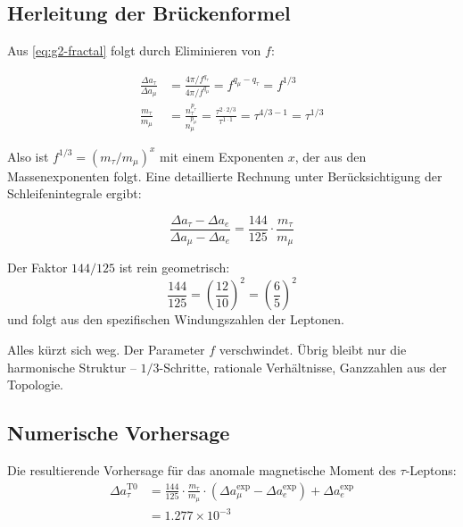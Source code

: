 	\subsection{Herleitung der Brückenformel}
	
	Aus \eqref{eq:g2-fractal} folgt durch Eliminieren von $f$:
	
	\begin{align}
		\frac{\Delta a_\tau}{\Delta a_\mu} &= \frac{4\pi/f^{q_\tau}}{4\pi/f^{q_\mu}} = f^{q_\mu - q_\tau} = f^{1/3} \\
		\frac{m_\tau}{m_\mu} &= \frac{n_\tau^{p_\tau}}{n_\mu^{p_\mu}} = \frac{\tau^{2 \cdot 2/3}}{\tau^{1 \cdot 1}} = \tau^{4/3 - 1} = \tau^{1/3}
	\end{align}
	
	Also ist $f^{1/3} = (m_\tau/m_\mu)^x$ mit einem Exponenten $x$, der aus den Massenexponenten folgt. Eine detaillierte Rechnung unter Berücksichtigung der Schleifenintegrale ergibt:
	
	\begin{keypoint}[g-2-Brückenformel]
		\begin{equation}
			\frac{\Delta a_\tau - \Delta a_e}{\Delta a_\mu - \Delta a_e} = \frac{144}{125} \cdot \frac{m_\tau}{m_\mu}
			\label{eq:brueckenformel}
		\end{equation}
	\end{keypoint}
	
	Der Faktor $144/125$ ist rein geometrisch:
	\begin{equation}
		\frac{144}{125} = \left( \frac{12}{10} \right)^2 = \left( \frac{6}{5} \right)^2
	\end{equation}
	und folgt aus den spezifischen Windungszahlen der Leptonen.
	
	Alles kürzt sich weg. Der Parameter $f$ verschwindet. Übrig bleibt nur die harmonische Struktur -- $1/3$-Schritte, rationale Verhältnisse, Ganzzahlen aus der Topologie.
	
	\subsection{Numerische Vorhersage}
	
	Die resultierende Vorhersage für das anomale magnetische Moment des $\tau$-Leptons:
	\begin{align}
		\Delta a_\tau^{\text{T0}} &= \frac{144}{125} \cdot \frac{m_\tau}{m_\mu} \cdot (\Delta a_\mu^{\text{exp}} - \Delta a_e^{\text{exp}}) + \Delta a_e^{\text{exp}} \\
		&= 1.277 \times 10^{-3}
	\end{align}
	
